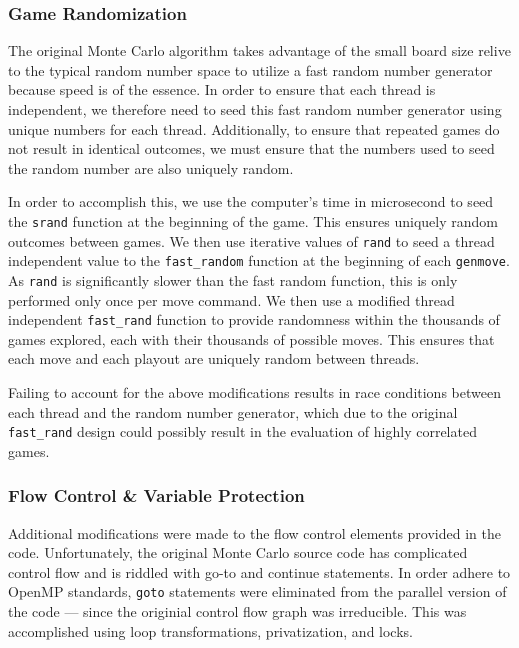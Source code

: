 \documentclass[nocopyrightspace, 10pt]{sigplanconf}
\begin{document}
\subsubsection{Game Randomization}

The original Monte Carlo algorithm takes advantage of the small board size relive to the typical random number space to utilize a fast random number generator because speed is of the essence.  In order to ensure that each thread is independent, we therefore need to seed this fast random number generator using unique numbers for each thread.  Additionally, to ensure that repeated games do not result in identical outcomes, we must ensure that the numbers used to seed the random number are also uniquely random.  

In order to accomplish this, we use the computer's time in 
 microsecond to seed the \texttt{srand} function at the beginning of the game.  This ensures uniquely random outcomes between games.  We then use iterative values of \texttt{rand} to seed a thread independent value to the \texttt{fast\_random} function at the beginning of each \texttt{genmove}.  As \texttt{rand} is significantly slower than the fast random function, this is only performed only once per move command.  We then use a modified thread independent \texttt{fast\_rand} function to provide randomness within the thousands of games explored, each with their thousands of possible moves.  This ensures that each move and each playout are uniquely random between threads.

Failing to account for the above modifications results in race conditions between each thread and the random number generator, which due to the original \texttt{fast\_rand} design could possibly result in the evaluation of highly correlated games.

\subsubsection{Flow Control \& Variable Protection}

	Additional modifications were made to the flow control elements provided in the code.  Unfortunately, the original Monte Carlo source code has complicated control flow and is riddled with go-to and continue statements.  In order adhere to OpenMP standards, \texttt{goto} statements were eliminated from the parallel version of the code --- since the originial control flow graph was irreducible.  This was accomplished using loop transformations, privatization, and locks.
	
\end{document}
